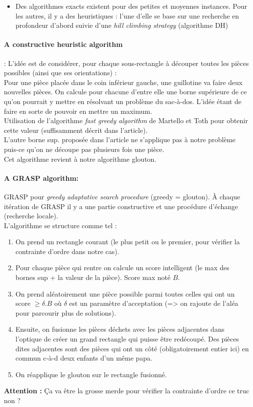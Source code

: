 \documentclass{article}
\begin{document}
    \begin{itemize}
        \item Des algorithmes exacts existent pour des petites et moyennes instances. Pour les autres, il y a des heuristiques : l'une d'elle se base sur une recherche en profondeur d'abord suivie d'une \textit{hill climbing strategy} (algorithme DH)
    \end{itemize}

    \paragraph{A constructive heuristic algorithm} : L'idée est de considérer, pour chaque sous-rectangle à découper toutes les pièces possibles (ainsi que ses orientations) :\\
     Pour une pièce placée dans le coin inférieur gauche, une guillotine va faire deux nouvelles pièces. On calcule pour chacune d'entre elle une borne supérieure de ce qu'on pourrait y mettre en résolvant un problème du sac-à-dos. L'idée étant de faire en sorte de pouvoir en mettre un maximum.\\ 
    Utilisation de l'algorithme \textit{fast greedy algorithm} de Martello et Toth pour obtenir cette valeur (suffisamment décrit dans l'article).\\
    L'autre borne sup. proposée dans l'article ne s'applique pas à notre problème puis-ce qu'on ne découpe pas plusieurs fois une pièce.\\
    Cet algorithme revient à notre algorithme glouton.

    \paragraph{A GRASP algorithm: } GRASP pour \textit{greedy adaptative search procedure} (greedy = glouton). À chaque itération de GRASP il y a une partie constructive et une procédure d'échange (recherche locale).\\
    L'algorithme se structure comme tel :
    \begin{enumerate}
        \item On prend un rectangle courant (le plus petit ou le premier, pour vérifier la contrainte d'ordre dans notre cas).
        \item Pour chaque pièce qui rentre on calcule un score intelligent (le max des bornes sup + la valeur de la pièce). Score max noté $B$.
        \item On prend aléatoirement une pièce possible parmi toutes celles qui ont un score $\geq \delta.B$ où $\delta$ est un paramètre d'acceptation (=> on rajoute de l'aléa pour parcourir plus de solutions).
        \item Ensuite, on fusionne les pièces déchets avec les pièces adjacentes dans l'optique de créer un grand rectangle qui puisse être redécoupé. Des pièces dites adjacentes sont des pièces qui ont un côté (obligatoirement entier ici) en commun c-à-d deux enfants d'un même papa.
        \item On réapplique le glouton sur le rectangle fusionné. 
    \end{enumerate}
    \textbf{Attention :} Ça va être la grosse merde pour vérifier la contrainte d'ordre ce truc non ?
\end{document}

